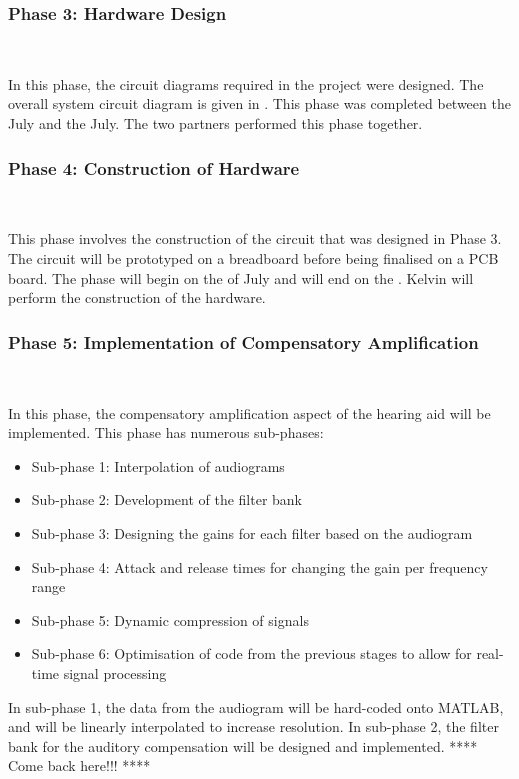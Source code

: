 \documentclass[10pt,twocolumn]{witseiepaper}
\begin{document}
\subsubsection*{Phase 3: Hardware Design } $    $

In this phase, the circuit diagrams required in the project were designed. The overall system circuit diagram is given in . This phase was completed between the  July and the  July. The two partners performed this phase together.

\subsubsection*{Phase 4: Construction of Hardware } $    $

This phase involves the construction of the circuit that was designed in Phase 3. The circuit will be prototyped on a breadboard before being finalised on a PCB board. The phase will begin on the  of July and will end on the . Kelvin will perform the construction of the hardware.

\subsubsection*{Phase 5: Implementation of Compensatory Amplification} $    $

In this phase, the compensatory amplification aspect of the hearing aid will be implemented. This phase has numerous sub-phases:
\begin{itemize}
	\item Sub-phase 1: Interpolation of audiograms 
	\item Sub-phase 2: Development of the filter bank
	\item Sub-phase 3: Designing the gains for each filter based on the audiogram
	\item Sub-phase 4: Attack and release times for changing the gain per frequency range 
	\item Sub-phase 5: Dynamic compression of signals
	\item Sub-phase 6: Optimisation of code from the previous stages to allow for real-time signal processing
\end{itemize}

In sub-phase 1, the data from the audiogram will be hard-coded onto MATLAB, and will be linearly interpolated to increase resolution. In sub-phase 2, the filter bank for the auditory compensation will be designed and implemented. 
**** Come back here!!! ****
\end{document}
